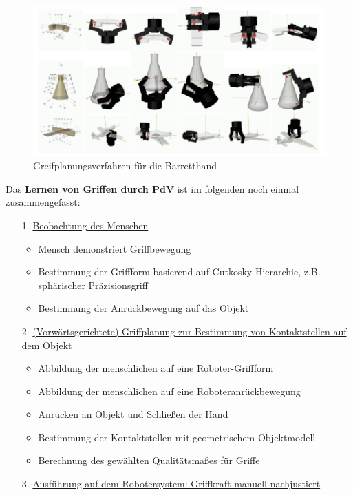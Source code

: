 \begin{figure}[ht]\centering 
\includegraphics[width=0.5\linewidth]{figures/ch04_griffe.png}
\caption{Greifplanungsverfahren für die Barretthand}
\label{fig:ch04_griffe}
\end{figure}
\newpage
Das \textbf{Lernen von Griffen durch PdV} ist im folgenden noch einmal zusammengefasst:
\begin{itemize}
\item[1.] \underline{Beobachtung des Menschen}
\begin{itemize}
\item Mensch demonstriert Griffbewegung
\item Bestimmung der Griffform basierend auf Cutkosky-Hierarchie, z.B. sphärischer Präzisionsgriff
\item Bestimmung der Anrückbewegung auf das Objekt
\end{itemize} 
\item[2.] \underline{(Vorwärtsgerichtete) Griffplanung zur Bestimmung von Kontaktstellen auf dem Objekt}
\begin{itemize}
\item Abbildung der menschlichen auf eine Roboter-Griffform
\item Abbildung der menschlichen auf eine Roboteranrückbewegung
\item Anrücken an Objekt und Schließen der Hand
\item Bestimmung der Kontaktstellen mit geometrischem Objektmodell
\item Berechnung des gewählten Qualitätsmaßes für Griffe
\end{itemize}
\item[3.] \underline{Ausführung auf dem Robotersystem: Griffkraft manuell nachjustiert}
\end{itemize}